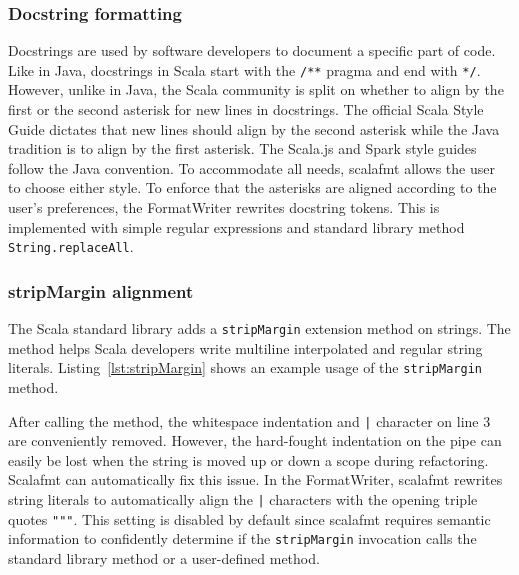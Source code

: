 \subsubsection{Docstring formatting}\label{sec:docstring}
Docstrings are used by software developers to document a specific part of code.
Like in Java, docstrings in Scala start with the \texttt{/**} pragma and end with \texttt{*/}.
However, unlike in Java, the Scala community is split on whether to align by the first or the second asterisk for new lines in docstrings.
The official Scala Style Guide\autocite{Scala80:online} dictates that new lines should align by the second asterisk while the Java tradition is to align by the first asterisk.
The Scala.js\autocite{doeraene_scala.js_2015} and Spark\autocite{xin_spark_2015} style guides follow the Java convention.
To accommodate all needs, scalafmt allows the user to choose either style.
To enforce that the asterisks are aligned according to the user's preferences,
the FormatWriter rewrites docstring tokens.
This is implemented with simple regular expressions and standard library method \texttt{String.replaceAll}.

\subsubsection{stripMargin alignment}
The Scala standard library adds a \texttt{stripMargin} extension method on strings.
The method helps Scala developers write multiline interpolated and regular string literals.
Listing~\ref{lst:stripMargin} shows an example usage of the \texttt{stripMargin} method.
\begin{minipage}{\linewidth}
  
\end{minipage}
After calling the method, the whitespace indentation and \texttt{|} character on line 3 are conveniently removed.
However, the hard-fought indentation on the pipe can easily be lost when the string is moved up or down a scope during refactoring.
Scalafmt can automatically fix this issue.
In the FormatWriter, scalafmt rewrites string literals to automatically align the \texttt{|} characters with the opening triple quotes \texttt{"""}.
This setting is disabled by default since scalafmt requires semantic information to confidently determine if the \texttt{stripMargin} invocation calls the standard library method or a user-defined method.

